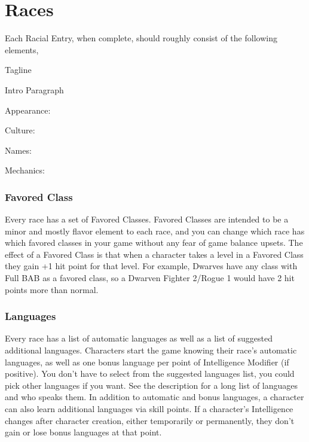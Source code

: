 \chapter{Races}

Each Racial Entry, when complete, should roughly consist of the following elements,

Tagline

Intro Paragraph

Appearance:

Culture:

Names:

Mechanics:

\subsection{Favored Class}

Every race has a set of Favored Classes. Favored Classes are intended to be a minor and mostly flavor element to each race, and you can change which race has which favored classes in your game without any fear of game balance upsets. The effect of a Favored Class is that when a character takes a level in a Favored Class they gain +1 hit point for that level. For example, Dwarves have any class with Full BAB as a favored class, so a Dwarven Fighter 2/Rogue 1 would have 2 hit points more than normal.

\subsection{Languages}

Every race has a list of automatic languages as well as a list of suggested additional languages. Characters start the game knowing their race's automatic languages, as well as one bonus language per point of Intelligence Modifier (if positive). You don't have to select from the suggested languages list, you could pick other languages if you want. See the  description for a long list of languages and who speaks them. In addition to automatic and bonus languages, a character can also learn additional languages via skill points. If a character's Intelligence changes after character creation, either temporarily or permanently, they don't gain or lose bonus languages at that point.
















